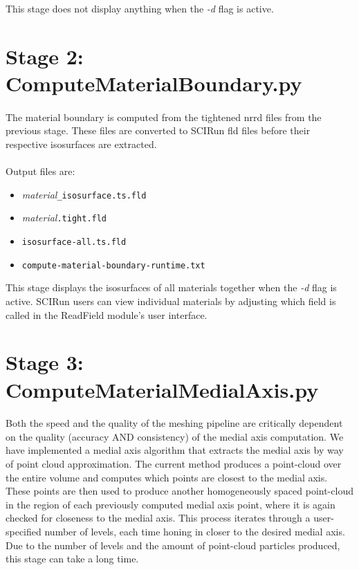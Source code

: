 \documentclass[fleqn,12pt,openany]{book}
\begin{document}
This stage does not display anything when the \emph{-d} flag is active.

\section{Stage 2: ComputeMaterialBoundary.py}

\paragraph{}
The material boundary is computed from the tightened nrrd files from the previous 
stage.
These files are converted to SCIRun fld files before their respective isosurfaces are extracted. \\ \\

Output files are:
\begin{itemize}

\item{\emph{material}\verb+_isosurface.ts.fld+}
\item{\emph{material}\verb+.tight.fld+}
\item{\verb+isosurface-all.ts.fld+}
\item{\verb+compute-material-boundary-runtime.txt+}

\end{itemize}

This stage displays the isosurfaces of all materials together when the \emph{-d} 
flag is active. SCIRun users can view individual materials by adjusting which 
field is called in the ReadField module's user interface.

\section{Stage 3: ComputeMaterialMedialAxis.py}

\paragraph{}
Both the speed and the quality of the meshing pipeline are critically dependent 
on the quality (accuracy AND consistency) of the medial axis computation. We 
have implemented a medial axis algorithm that extracts the medial axis by way 
of point cloud approximation. The current method produces a point-cloud over 
the entire volume and computes which points are closest to the medial axis.  
These points are then used to produce another homogeneously spaced point-cloud 
in the region of each previously computed medial axis point, where it is again 
checked for closeness to the medial axis. This process iterates through a user-specified number of  
levels, each time honing in closer to the desired medial axis. Due to the 
number of levels and the amount of point-cloud particles produced, this stage 
can take a long time.  \\ \\
\end{document}
